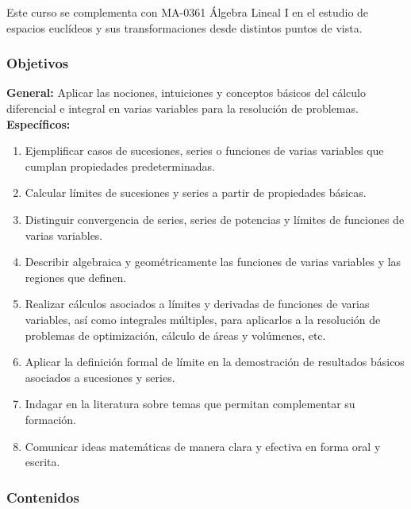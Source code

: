 \begin{refsection}
Este curso se complementa con MA-0361 Álgebra Lineal I en el estudio de espacios euclídeos y sus transformaciones desde distintos puntos de vista. 



\subsubsection*{Objetivos}

\textbf{General:} Aplicar las nociones, intuiciones y conceptos básicos del cálculo diferencial e integral en varias variables para la resolución de problemas. \\

\textbf{Específicos:}

\begin{enumerate}
\item Ejemplificar casos de sucesiones, series o funciones de varias variables que cumplan propiedades predeterminadas.
\item Calcular límites de sucesiones y series a partir de propiedades básicas.
\item Distinguir convergencia de series, series de potencias y límites de funciones de varias variables.
\item Describir algebraica y geométricamente las funciones de varias variables y las regiones que definen.
\item Realizar cálculos asociados a límites y derivadas de funciones de varias variables, así como integrales múltiples, para aplicarlos a la resolución de problemas de optimización, cálculo de áreas y volúmenes, etc.
\item Aplicar la definición formal de límite en la demostración de resultados básicos asociados a sucesiones y series. 
\item Indagar en la literatura sobre temas que permitan complementar su formación.
\item Comunicar ideas matemáticas de manera clara y efectiva en forma oral y escrita.
\end{enumerate} 

\subsubsection*{Contenidos}


\end{refsection}
